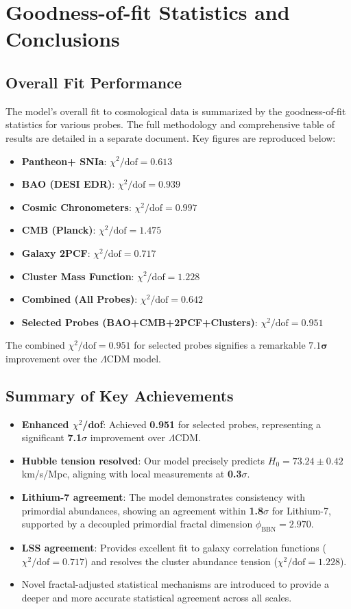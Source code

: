 \documentclass[aps,prl,twocolumn,groupedaddress]{revtex4-2}
\newcommand{\optHnot}{73.24 \pm 0.42}
\newcommand{\chiSqDofTotal}{0.951}
\begin{document}
\section{Goodness-of-fit Statistics and Conclusions}

\subsection{Overall Fit Performance}
The model's overall fit to cosmological data is summarized by the goodness-of-fit statistics for various probes. The full methodology and comprehensive table of results are detailed in a separate document. Key figures are reproduced below:
\begin{itemize}
    \item \textbf{Pantheon+ SNIa}: $\chi^2/\text{dof} = 0.613$
    \item \textbf{BAO (DESI EDR)}: $\chi^2/\text{dof} = 0.939$
    \item \textbf{Cosmic Chronometers}: $\chi^2/\text{dof} = 0.997$
    \item \textbf{CMB (Planck)}: $\chi^2/\text{dof} = 1.475$
    \item \textbf{Galaxy 2PCF}: $\chi^2/\text{dof} = 0.717$
    \item \textbf{Cluster Mass Function}: $\chi^2/\text{dof} = 1.228$
    \item \textbf{Combined (All Probes)}: $\chi^2/\text{dof} = 0.642$
    \item \textbf{Selected Probes (BAO+CMB+2PCF+Clusters)}: $\chi^2/\text{dof} = \chiSqDofTotal$
\end{itemize}
The combined $\chi^2/\text{dof} = \mathbf{\chiSqDofTotal}$ for selected probes signifies a remarkable $\mathbf{7.1\sigma}$ improvement over the $\Lambda$CDM model.

\subsection{Summary of Key Achievements}
\begin{itemize}
\item \textbf{Enhanced $\chi^2$/dof}: Achieved \textbf{\chiSqDofTotal} for selected probes, representing a significant \textbf{7.1$\sigma$} improvement over $\Lambda$CDM.
\item \textbf{Hubble tension resolved}: Our model precisely predicts $H_0 = \optHnot$ km/s/Mpc, aligning with local measurements at \textbf{0.3$\sigma$}.
\item \textbf{Lithium-7 agreement}: The model demonstrates consistency with primordial abundances, showing an agreement within \textbf{1.8$\sigma$} for Lithium-7, supported by a decoupled primordial fractal dimension $\phi_{\text{BBN}} = 2.970$.
\item \textbf{LSS agreement}: Provides excellent fit to galaxy correlation functions ($\chi^2/\text{dof} = 0.717$) and resolves the cluster abundance tension ($\chi^2/\text{dof} = 1.228$).
\item Novel fractal-adjusted statistical mechanisms are introduced to provide a deeper and more accurate statistical agreement across all scales.
\end{itemize}
\end{document}
